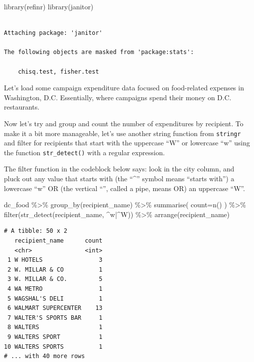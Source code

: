 \documentclass[
  letterpaper,
  DIV=11,
  numbers=noendperiod]{scrreprt}
\newenvironment{Shaded}{\begin{snugshade}}{\end{snugshade}}
\newcommand{\AttributeTok}[1]{\textcolor[rgb]{0.40,0.45,0.13}{#1}}
\newcommand{\FunctionTok}[1]{\textcolor[rgb]{0.28,0.35,0.67}{#1}}
\newcommand{\NormalTok}[1]{\textcolor[rgb]{0.00,0.23,0.31}{#1}}
\newcommand{\SpecialCharTok}[1]{\textcolor[rgb]{0.37,0.37,0.37}{#1}}
\newcommand{\StringTok}[1]{\textcolor[rgb]{0.13,0.47,0.30}{#1}}
\begin{document}
\begin{Shaded}
\begin{Highlighting}[]
\FunctionTok{library}\NormalTok{(refinr)}
\FunctionTok{library}\NormalTok{(janitor)}
\end{Highlighting}
\end{Shaded}

\begin{verbatim}

Attaching package: 'janitor'

The following objects are masked from 'package:stats':

    chisq.test, fisher.test
\end{verbatim}

Let's load some campaign expenditure data focused on food-related
expenses in Washington, D.C. Essentially, where campaigns spend their
money on D.C. restaurants.

Now let's try and group and count the number of expenditures by
recipient. To make it a bit more manageable, let's use another string
function from \texttt{stringr} and filter for recipients that start with
the uppercase ``W'' or lowercase ``w'' using the function
\texttt{str\_detect()} with a regular expression.

The filter function in the codeblock below says: look in the city
column, and pluck out any value that starts with (the ``\^{}'' symbol
means ``starts with'') a lowercase ``w'' OR (the vertical
``\textbar{}'', called a pipe, means OR) an uppercase ``W''.

\begin{Shaded}
\begin{Highlighting}[]
\NormalTok{dc\_food }\SpecialCharTok{\%\textgreater{}\%}
  \FunctionTok{group\_by}\NormalTok{(recipient\_name) }\SpecialCharTok{\%\textgreater{}\%}
  \FunctionTok{summarise}\NormalTok{(}
    \AttributeTok{count=}\FunctionTok{n}\NormalTok{()}
\NormalTok{  ) }\SpecialCharTok{\%\textgreater{}\%}
  \FunctionTok{filter}\NormalTok{(}\FunctionTok{str\_detect}\NormalTok{(recipient\_name, }\StringTok{\textquotesingle{}\^{}w|\^{}W\textquotesingle{}}\NormalTok{)) }\SpecialCharTok{\%\textgreater{}\%} 
  \FunctionTok{arrange}\NormalTok{(recipient\_name)}
\end{Highlighting}
\end{Shaded}

\begin{verbatim}
# A tibble: 50 x 2
   recipient_name      count
   <chr>               <int>
 1 W HOTELS                3
 2 W. MILLAR & CO          1
 3 W. MILLAR & CO.         5
 4 WA METRO                1
 5 WAGSHAL'S DELI          1
 6 WALMART SUPERCENTER    13
 7 WALTER'S SPORTS BAR     1
 8 WALTERS                 1
 9 WALTERS SPORT           1
10 WALTERS SPORTS          1
# ... with 40 more rows
\end{verbatim}
\end{document}
